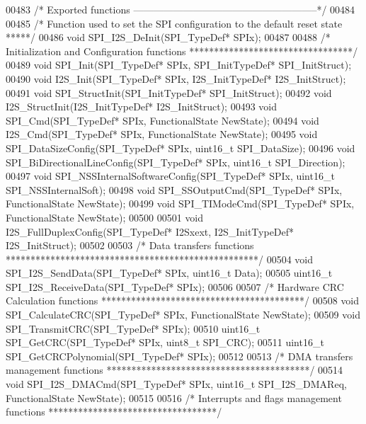 \begin{DoxyCode}
00483 \textcolor{comment}{/* Exported functions --------------------------------------------------------*/}
00484 
00485 \textcolor{comment}{/*  Function used to set the SPI configuration to the default reset state *****/}
00486 \textcolor{keywordtype}{void} SPI_I2S_DeInit(SPI\_TypeDef* SPIx);
00487 
00488 \textcolor{comment}{/* Initialization and Configuration functions *********************************/}
00489 \textcolor{keywordtype}{void} SPI_Init(SPI\_TypeDef* SPIx, SPI\_InitTypeDef* SPI\_InitStruct);
00490 \textcolor{keywordtype}{void} I2S_Init(SPI\_TypeDef* SPIx, I2S\_InitTypeDef* I2S\_InitStruct);
00491 \textcolor{keywordtype}{void} SPI_StructInit(SPI\_InitTypeDef* SPI\_InitStruct);
00492 \textcolor{keywordtype}{void} I2S_StructInit(I2S\_InitTypeDef* I2S\_InitStruct);
00493 \textcolor{keywordtype}{void} SPI_Cmd(SPI\_TypeDef* SPIx, FunctionalState NewState);
00494 \textcolor{keywordtype}{void} I2S_Cmd(SPI\_TypeDef* SPIx, FunctionalState NewState);
00495 \textcolor{keywordtype}{void} SPI_DataSizeConfig(SPI\_TypeDef* SPIx, uint16\_t SPI\_DataSize);
00496 \textcolor{keywordtype}{void} SPI_BiDirectionalLineConfig(SPI\_TypeDef* SPIx, uint16\_t SPI\_Direction);
00497 \textcolor{keywordtype}{void} SPI_NSSInternalSoftwareConfig(SPI\_TypeDef* SPIx, uint16\_t SPI\_NSSInternalSoft);
00498 \textcolor{keywordtype}{void} SPI_SSOutputCmd(SPI\_TypeDef* SPIx, FunctionalState NewState);
00499 \textcolor{keywordtype}{void} SPI_TIModeCmd(SPI\_TypeDef* SPIx, FunctionalState NewState);
00500 
00501 \textcolor{keywordtype}{void} I2S_FullDuplexConfig(SPI\_TypeDef* I2Sxext, I2S\_InitTypeDef* I2S\_InitStruct);
00502 
00503 \textcolor{comment}{/* Data transfers functions ***************************************************/}
00504 \textcolor{keywordtype}{void} SPI_I2S_SendData(SPI\_TypeDef* SPIx, uint16\_t Data);
00505 uint16\_t SPI_I2S_ReceiveData(SPI\_TypeDef* SPIx);
00506 
00507 \textcolor{comment}{/* Hardware CRC Calculation functions *****************************************/}
00508 \textcolor{keywordtype}{void} SPI_CalculateCRC(SPI\_TypeDef* SPIx, FunctionalState NewState);
00509 \textcolor{keywordtype}{void} SPI_TransmitCRC(SPI\_TypeDef* SPIx);
00510 uint16\_t SPI_GetCRC(SPI\_TypeDef* SPIx, uint8\_t SPI\_CRC);
00511 uint16\_t SPI_GetCRCPolynomial(SPI\_TypeDef* SPIx);
00512 
00513 \textcolor{comment}{/* DMA transfers management functions *****************************************/}
00514 \textcolor{keywordtype}{void} SPI_I2S_DMACmd(SPI\_TypeDef* SPIx, uint16\_t SPI\_I2S\_DMAReq, FunctionalState NewState);
00515 
00516 \textcolor{comment}{/* Interrupts and flags management functions **********************************/}

\end{DoxyCode}
